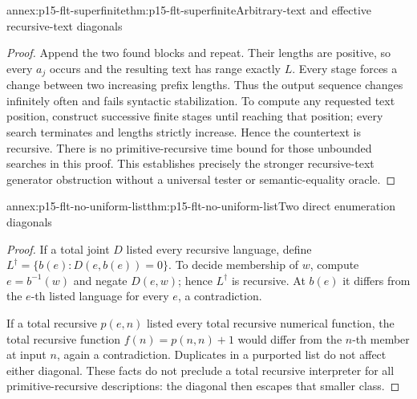 \begin{annexitem}{annex:p15-flt-superfinite}{thm:p15-flt-superfinite}{Arbitrary-text and effective recursive-text diagonals}
\begin{proof}
Append the two found blocks and repeat.
Their lengths are positive, so every \(a_j\) occurs
and the resulting text has range exactly \(L\).
Every stage forces a change between two increasing
prefix lengths. Thus the output sequence changes
infinitely often and fails syntactic stabilization.
To compute any requested text position, construct
successive finite stages until reaching that position;
every search terminates and lengths strictly increase.
Hence the countertext is recursive.
There is no primitive-recursive time bound for those
unbounded searches in this proof.
This establishes precisely the stronger recursive-text
generator obstruction without a universal tester or
semantic-equality oracle.
\end{proof}
\end{annexitem}

\begin{annexitem}{annex:p15-flt-no-uniform-list}{thm:p15-flt-no-uniform-list}{Two direct enumeration diagonals}
\begin{proof}
If a total joint \(D\) listed every recursive language,
define \(L^\dagger=\{b(e):D(e,b(e))=0\}\).
To decide membership of \(w\), compute \(e=b^{-1}(w)\)
and negate \(D(e,w)\); hence \(L^\dagger\) is recursive.
At \(b(e)\) it differs from the \(e\)-th listed language
for every \(e\), a contradiction.

If a total recursive \(p(e,n)\) listed every total
recursive numerical function, the total recursive
function \(f(n)=p(n,n)+1\) would differ from the
\(n\)-th member at input \(n\), again a contradiction.
Duplicates in a purported list do not affect either
diagonal. These facts do not preclude a total recursive
interpreter for all primitive-recursive descriptions:
the diagonal then escapes that smaller class.
\end{proof}
\end{annexitem}

